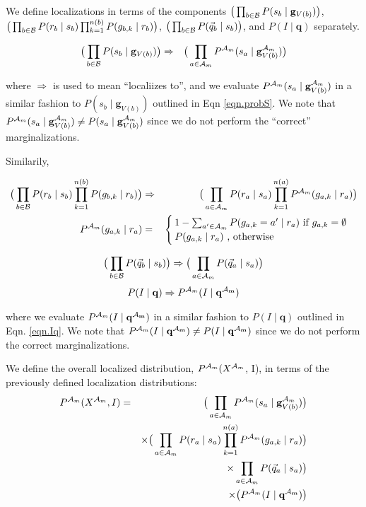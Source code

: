 \documentclass[11pt]{article}
\newcommand{\A}{{\cal A}}
\newcommand{\B}{\cal B}
\newcommand{\Am}{\A_{m}}
\newcommand{\qb}{\vec{q}_b}
\newcommand{\qa}{\vec{q}_a}
\begin{document}
We define localizations in terms of the components $\big( \prod_{b \in {\B}} P(s_b \mid \mathbf{g}_{V(b)}) \big )$, $\big( \prod_{b \in {\B}} P(r_b \mid s_b) \prod_{k=1}^{n(b)} P(g_{b,k} \mid r_b) \big)$, $\big( \prod_{b \in {\B}} P(\qb \mid s_b)\big)$, and $P(I \mid \mathbf{q})$ separately.

\begin{eqnarray}
\big(\prod_{b \in {\B}} P(s_b \mid \mathbf{g}_{V(b)}) \big ) &\Rightarrow& \big(\prod_{a \in {\Am}} P^{\Am}(s_a \mid \mathbf{g}^{\Am}_{V({b})}) \big )
\end{eqnarray}

where $\Rightarrow$ is used to mean ``localiizes to'', and we evaluate $P^{\Am}(s_a \mid \mathbf{g}^{\Am}_{V({b})})$ in a similar fashion to $P(s_b \mid \mathbf{g}_{V(b)})$ outlined in Eqn \ref{eqn.probS}. We note that $P^{\Am}(s_a \mid \mathbf{g}^{\Am}_{V({b})}) \neq P(s_a \mid \mathbf{g}^{\Am}_{V({b})})$ since we do not perform the ``correct'' marginalizations.

Similarily, 

\begin{eqnarray}
\big( \prod_{b \in {\B}} P(r_b \mid s_b) \prod_{k=1}^{n(b)} P(g_{b,k} \mid r_b) \big) &\Rightarrow& \big( \prod_{a \in \Am} P(r_a \mid s_a) \prod_{k=1}^{n(a)} P^{\Am}(g_{a,k} \mid r_a) \big) \\
%
P^{\Am}(g_{a,k} \mid r_a) &=& \begin{cases} \label{actPg} 1-\sum_{a' \in {\Am}} P(g_{a,k} = a' \mid r_a) \mbox{ if } g_{a,k} = \emptyset \\
 P(g_{a,k} \mid r_a) \mbox{ , otherwise } \end{cases}
\end{eqnarray}

\begin{eqnarray}
\big( \prod_{b \in {\B}} P(\qb \mid s_b)\big) \Rightarrow \big( \prod_{a \in {\Am}} P(\qa \mid s_a)\big)
\end{eqnarray}
\begin{eqnarray}
P(I \mid \mathbf{q}) \Rightarrow P^{\Am}(I \mid \mathbf{q^{\Am}})
\end{eqnarray}

where we evaluate $P^{\Am}(I \mid \mathbf{q^{\Am}})$ in a similar fashion to $P(I \mid \mathbf{q})$ outlined in Eqn. \ref{eqn.Iq}. We note that $P^{\Am}(I \mid \mathbf{q^{\Am}}) \neq P(I \mid \mathbf{q^{\Am}})$ since we do not perform the correct marginalizations.

We define the overall localized distribution, $P^{\Am}(X^{\Am}$, I), in terms of the previously defined localization distributions:
\begin{eqnarray}
P^{\Am}(X^{\Am}, I)
&=& \big(\prod_{a \in {\Am}} P^{\Am}(s_a \mid \mathbf{g}^{\Am}_{V({b})}) \big ) \label{eqn.localJoint}\\
& & \times \big( \prod_{a \in {\Am}} P(r_a \mid s_a) \prod_{k=1}^{n(a)} P^{\Am}(g_{a,k} \mid r_a) \big) \nonumber \\
& & \times \prod_{a \in {\Am}} P(\qa \mid s_a)\big) \nonumber \\
& & \times \big( P^{\Am}(I \mid \mathbf{q^{\Am}}) \big) \nonumber
\end{eqnarray}
\end{document}
